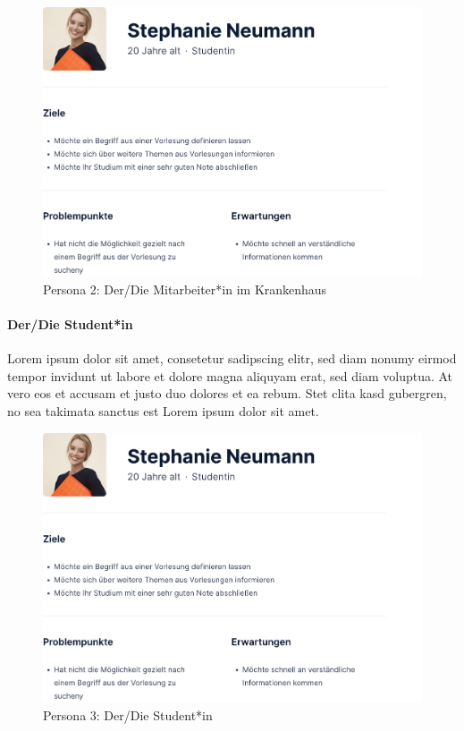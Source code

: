 \begin{figure}[H]
	\centering
    	\includegraphics[width=1.1\textwidth]{Images/Persona_3}
   	\caption{Persona 2: Der/Die Mitarbeiter*in im Krankenhaus}
   	\label{fig:persona2}
\end{figure}

\paragraph{Der/Die Student*in} 

Lorem ipsum dolor sit amet, consetetur sadipscing elitr, sed diam nonumy eirmod tempor invidunt ut labore et dolore magna aliquyam erat, sed diam voluptua. 
At vero eos et accusam et justo duo dolores et ea rebum. 
Stet clita kasd gubergren, no sea takimata sanctus est Lorem ipsum dolor sit amet.

\begin{figure}[H]
	\centering
    	\includegraphics[width=1.1\textwidth]{Images/Persona_3}
   	\caption{Persona 3: Der/Die Student*in}
   	\label{fig:persona3}
\end{figure}

